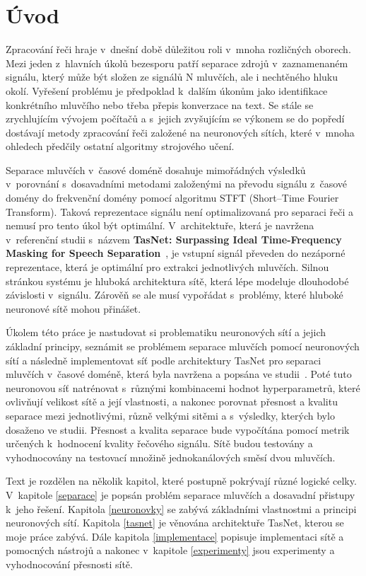 \chapter{Úvod}
Zpracování řeči hraje v~dnešní době důležitou roli v~mnoha rozličných oborech. Mezi jeden z~hlavních úkolů bezesporu patří separace zdrojů v~zaznamenaném signálu, který může být složen ze signálů N mluvčích, ale i nechtěného hluku okolí. Vyřešení problému je předpoklad k~dalším úkonům jako identifikace konkrétního mluvčího nebo třeba přepis konverzace na text. Se stále se zrychlujícím vývojem počítačů a s~jejich zvyšujícím se výkonem se do popředí dostávají metody zpracování řeči založené na neuronových sítích, které v~mnoha ohledech předčily ostatní algoritmy strojového učení.

Separace mluvčích v~časové doméně dosahuje mimořádných výsledků v~porovnání s~dosavadními metodami  založenými na převodu signálu z~časové domény do frekvenční domény pomocí algoritmu STFT (Short--Time Fourier Transform). Taková reprezentace signálu není optimalizovaná pro separaci řeči a nemusí pro tento úkol být optimální. V~architektuře, která je navržena v~referenční studii s~názvem \textbf{TasNet: Surpassing Ideal Time-Frequency Masking for Speech Separation}~\cite{luo2018convtasnet}, je vstupní signál převeden do nezáporné reprezentace, která je optimální pro extrakci jednotlivých mluvčích. Silnou stránkou systému je hluboká architektura sítě, která lépe modeluje dlouhodobé závislosti v~signálu. Zárověň se ale musí vypořádat s~problémy, které hluboké neuronové sítě mohou přinášet.

Úkolem této práce je nastudovat si problematiku neuronových sítí a jejich základní principy, seznámit se problémem separace mluvčích pomocí neuronových sítí a následně implementovat síť podle architektury TasNet pro separaci mluvčích v~časové doméně, která byla navržena a popsána ve studii~\cite{luo2018convtasnet}. Poté tuto neuronovou síť natrénovat s~různými kombinacemi hodnot hyperparametrů, které ovlivňují velikost sítě a její vlastnosti, a nakonec porovnat přesnost a kvalitu separace mezi jednotlivými, různě velkými sitěmi a s~výsledky, kterých bylo dosaženo ve studii. Přesnost a kvalita separace bude vypočítána pomocí metrik určených k~hodnocení kvality řečového signálu. Sítě budou testovány a vyhodnocovány na testovací množině jednokanálových směsí dvou mluvčích.

Text je rozdělen na několik kapitol, které postupně pokrývají různé logické celky. V~kapitole \ref{separace} je popsán problém separace mluvčích a dosavadní přistupy k~jeho řešení. Kapitola \ref{neuronovky} se zabývá základními vlastnostmi a principi neuronových sítí. Kapitola \ref{tasnet} je věnována architektuře TasNet, kterou se moje práce zabývá. Dále kapitola \ref{implementace} popisuje implementaci sítě a pomocných nástrojů a nakonec v~kapitole \ref{experimenty} jsou experimenty a vyhodnocování přesnosti sítě.



